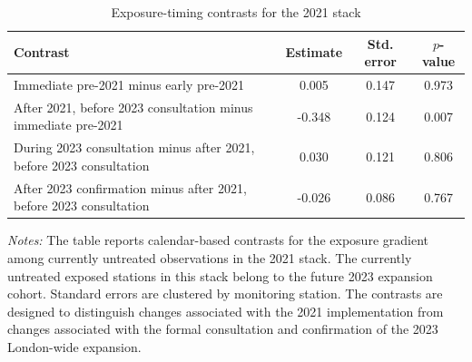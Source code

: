 \begin{table}[!htbp]
\centering
\caption{Exposure-timing contrasts for the 2021 stack}
\label{tab:ulez_exposure_timing_2021}
\small
\begin{threeparttable}
\begin{tabularx}{\textwidth}{Xccc}
\toprule
Contrast & Estimate & Std. error & $p$-value \\
\midrule
Immediate pre-2021 minus early pre-2021 & 0.005 & 0.147 & 0.973 \\
After 2021, before 2023 consultation minus immediate pre-2021 & -0.348 & 0.124 & 0.007 \\
During 2023 consultation minus after 2021, before 2023 consultation & 0.030 & 0.121 & 0.806 \\
After 2023 confirmation minus after 2021, before 2023 consultation & -0.026 & 0.086 & 0.767 \\
\bottomrule
\end{tabularx}
\begin{tablenotes}
\footnotesize
\item \emph{Notes:} The table reports calendar-based contrasts for the exposure gradient among currently untreated observations in the 2021 stack. The currently untreated exposed stations in this stack belong to the future 2023 expansion cohort. Standard errors are clustered by monitoring station. The contrasts are designed to distinguish changes associated with the 2021 implementation from changes associated with the formal consultation and confirmation of the 2023 London-wide expansion.
\end{tablenotes}
\end{threeparttable}
\end{table}

